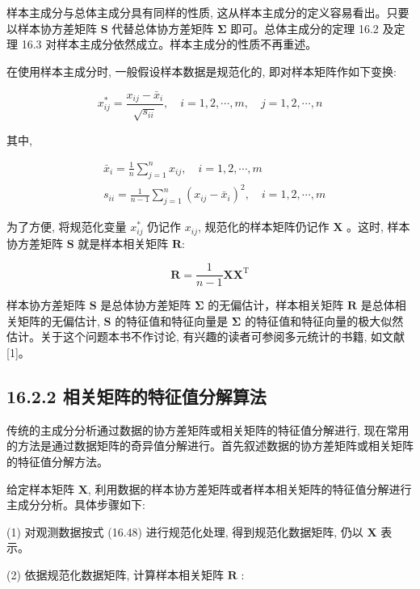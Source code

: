 \documentclass[10pt]{article}
\begin{document}
样本主成分与总体主成分具有同样的性质, 这从样本主成分的定义容易看出。只要以样本协方差矩阵 $\boldsymbol{S}$ 代替总体协方差矩阵 $\boldsymbol{\Sigma}$ 即可。总体主成分的定理 16.2 及定理 16.3 对样本主成分依然成立。样本主成分的性质不再重述。

在使用样本主成分时, 一般假设样本数据是规范化的, 即对样本矩阵作如下变换:


\begin{equation*}
x_{i j}^{*}=\frac{x_{i j}-\bar{x}_{i}}{\sqrt{s_{i i}}}, \quad i=1,2, \cdots, m, \quad j=1,2, \cdots, n \tag{16.48}
\end{equation*}


其中,

$$
\begin{aligned}
& \bar{x}_{i}=\frac{1}{n} \sum_{j=1}^{n} x_{i j}, \quad i=1,2, \cdots, m \\
& s_{i i}=\frac{1}{n-1} \sum_{j=1}^{n}\left(x_{i j}-\bar{x}_{i}\right)^{2}, \quad i=1,2, \cdots, m
\end{aligned}
$$

为了方便, 将规范化变量 $x_{i j}^{*}$ 仍记作 $x_{i j}$, 规范化的样本矩阵仍记作 $\boldsymbol{X}$ 。这时, 样本协方差矩阵 $\boldsymbol{S}$ 就是样本相关矩阵 $\boldsymbol{R}:$


\begin{equation*}
\boldsymbol{R}=\frac{1}{n-1} \boldsymbol{X} \boldsymbol{X}^{\mathrm{T}} \tag{16.49}
\end{equation*}


样本协方差矩阵 $\boldsymbol{S}$ 是总体协方差矩阵 $\boldsymbol{\Sigma}$ 的无偏估计，样本相关矩阵 $\boldsymbol{R}$ 是总体相关矩阵的无偏估计, $\boldsymbol{S}$ 的特征值和特征向量是 $\boldsymbol{\Sigma}$ 的特征值和特征向量的极大似然估计。关于这个问题本书不作讨论, 有兴趣的读者可参阅多元统计的书籍, 如文献 [1]。

\subsection*{16.2.2 相关矩阵的特征值分解算法}
传统的主成分分析通过数据的协方差矩阵或相关矩阵的特征值分解进行, 现在常用的方法是通过数据矩阵的奇异值分解进行。首先叙述数据的协方差矩阵或相关矩阵的特征值分解方法。

给定样本矩阵 $\boldsymbol{X}$, 利用数据的样本协方差矩阵或者样本相关矩阵的特征值分解进行主成分分析。具体步骤如下:

(1) 对观测数据按式 (16.48) 进行规范化处理, 得到规范化数据矩阵, 仍以 $\boldsymbol{X}$ 表示。

(2) 依据规范化数据矩阵, 计算样本相关矩阵 $\boldsymbol{R}$ :
\end{document}
